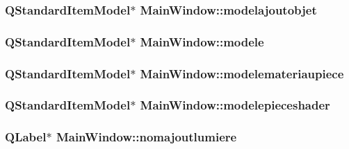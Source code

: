 \hypertarget{class_main_window_abaf343df783ca19135463902b101a832}{
\subsubsection[{modelajoutobjet}]{\setlength{\rightskip}{0pt plus 5cm}Q\+Standard\+Item\+Model$\ast$ Main\+Window\+::modelajoutobjet\hspace{0.3cm}{\ttfamily [private]}}}\label{class_main_window_abaf343df783ca19135463902b101a832}
\hypertarget{class_main_window_abb752b382e336483740c8e0ad21cbcf5}{
\subsubsection[{modele}]{\setlength{\rightskip}{0pt plus 5cm}Q\+Standard\+Item\+Model$\ast$ Main\+Window\+::modele\hspace{0.3cm}{\ttfamily [private]}}}\label{class_main_window_abb752b382e336483740c8e0ad21cbcf5}
\hypertarget{class_main_window_a7bdcda1e4a341f69651631c5ee882c41}{
\subsubsection[{modelemateriaupiece}]{\setlength{\rightskip}{0pt plus 5cm}Q\+Standard\+Item\+Model$\ast$ Main\+Window\+::modelemateriaupiece\hspace{0.3cm}{\ttfamily [private]}}}\label{class_main_window_a7bdcda1e4a341f69651631c5ee882c41}
\hypertarget{class_main_window_a6be7cafd28d97201c3df69a7b144f456}{
\subsubsection[{modelepieceshader}]{\setlength{\rightskip}{0pt plus 5cm}Q\+Standard\+Item\+Model$\ast$ Main\+Window\+::modelepieceshader\hspace{0.3cm}{\ttfamily [private]}}}\label{class_main_window_a6be7cafd28d97201c3df69a7b144f456}
\hypertarget{class_main_window_ad38c142eee23820d2d4c87217ea3558a}{
\subsubsection[{nomajoutlumiere}]{\setlength{\rightskip}{0pt plus 5cm}Q\+Label$\ast$ Main\+Window\+::nomajoutlumiere\hspace{0.3cm}{\ttfamily [private]}}}\label{class_main_window_ad38c142eee23820d2d4c87217ea3558a}

